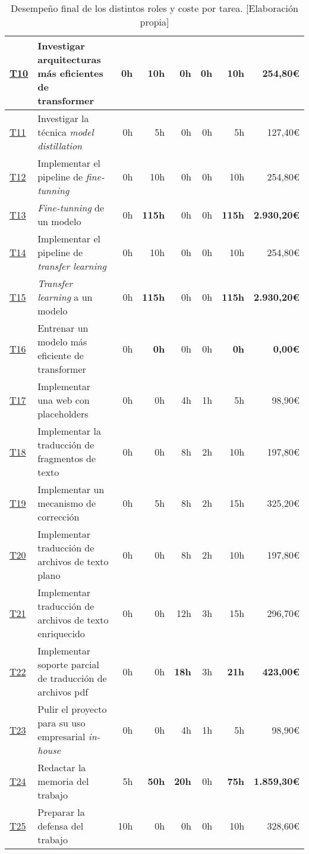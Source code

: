 \begin{landscape}
\begin{table}
\begin{tabular}{  l  l  r  r  r  r  r  r  }
        \hline
        \hyperref[T10]{T10} & Investigar arquitecturas más eficientes de transformer & 0h & 10h & 0h & 0h & 10h & 254,80\euro\\
        \hline
        \hyperref[T11]{T11} & Investigar la técnica \textit{model distillation} & 0h & 5h & 0h & 0h & 5h & 127,40\euro\\
        \hline
        \hyperref[T12]{T12} & Implementar el pipeline de \textit{fine-tunning} & 0h & 10h & 0h & 0h & 10h & 254,80\euro\\
        \hline
        \hyperref[T13]{T13} & \textit{Fine-tunning} de un modelo & 0h & \textbf{115h} & 0h & 0h & \textbf{115h} & \textbf{2.930,20\euro}\\
        \hline
        \hyperref[T14]{T14} & Implementar el pipeline de \textit{transfer learning} & 0h & 10h & 0h & 0h & 10h & 254,80\euro\\
        \hline
        \hyperref[T15]{T15} & \textit{Transfer learning} a un modelo & 0h & \textbf{115h} & 0h & 0h & \textbf{115h} & \textbf{2.930,20\euro}\\
        \hline
        \hyperref[T16]{T16} & Entrenar un modelo más eficiente de transformer & 0h & \textbf{0h} & 0h & 0h & \textbf{0h} & \textbf{0,00\euro}\\
        \hline
        \hyperref[T17]{T17} & Implementar una web con placeholders & 0h & 0h & 4h & 1h & 5h & 98,90\euro\\
        \hline
        \hyperref[T18]{T18} & Implementar la traducción de fragmentos de texto & 0h & 0h & 8h & 2h & 10h & 197,80\euro\\
        \hline
        \hyperref[T19]{T19} & Implementar un mecanismo de corrección & 0h & 5h & 8h & 2h & 15h & 325,20\euro\\
        \hline
        \hyperref[T20]{T20} & Implementar traducción de archivos de texto plano & 0h & 0h & 8h & 2h & 10h & 197,80\euro\\
        \hline
        \hyperref[T21]{T21} & Implementar traducción de archivos de texto enriquecido & 0h & 0h & 12h & 3h & 15h & 296,70\euro\\
        \hline
        \hyperref[T22]{T22} & Implementar soporte parcial de traducción de archivos pdf & 0h & 0h & \textbf{18h} & 3h & \textbf{21h} & \textbf{423,00\euro}\\
        \hline
        \hyperref[T23]{T23} & Pulir el proyecto para su uso empresarial \textit{in-house} & 0h & 0h & 4h & 1h & 5h & 98,90\euro\\
        \hline
        \hyperref[T24]{T24} & Redactar la memoria del trabajo & 5h & \textbf{50h} & \textbf{20h} & 0h & \textbf{75h} & \textbf{1.859,30\euro}\\
        \hline
        \hyperref[T25]{T25} & Preparar la defensa del trabajo & 10h & 0h & 0h & 0h & 10h & 328,60\euro\\
        \hline
    \end{tabular}
    \caption{Desempeño final de los distintos roles y coste por tarea. [Elaboración propia]}\label{taskroledecomposfinal}
    \end{table}
\end{landscape}
\restoregeometry

